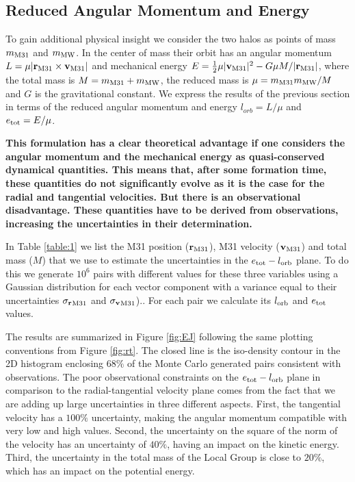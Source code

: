 \documentclass{emulateapj}
\begin{document}
\subsection{Reduced Angular Momentum and Energy}


To gain additional physical insight we consider the two halos as points of mass $m_{\rm M31}$ and $m_{\rm MW}$. In the center of mass their orbit has an angular momentum $L=\mu|{{\bf r}_{\rm M31}}\times{\bf v}_{\rm M31}|$ and mechanical energy $E=\frac{1}{2}\mu |{\bf v}_{\rm M31}|^2 - G\mu M/|{\bf r}_{\rm M31}|$, where the total mass is $M=m_{\rm M31}+m_{\rm MW}$, the reduced mass is $\mu=m_{\rm M31}m_{\rm MW}/M$ and $G$ is the gravitational constant. We express the results of the previous section in terms of the reduced angular momentum and energy $l_{orb}=L/\mu$ and $e_{\rm tot}=E/\mu$. 

{\bf This formulation has a clear theoretical advantage if one considers the angular momentum and the mechanical energy as quasi-conserved dynamical quantities. This means that, after some formation time, these quantities do not significantly evolve as it is the case for the radial and tangential velocities. But there is an observational disadvantage. These quantities have to be derived from observations, increasing the uncertainties in their determination.}

In Table \ref{table:1} we list the M31 position (${\bf r}_{\rm M31}$), M31 velocity (${\bf v}_{\rm M31}$) and total mass ($M$) that we use to estimate the uncertainties in the $e_{\rm tot}-l_{\rm orb}$ plane. To do this we generate $10^6$ pairs with different values for these three variables using a Gaussian distribution for each vector component with a variance equal to their uncertainties ${\sigma_{\bf r}}_{\rm M31}$ and ${\sigma_{\bf v}}_{\rm M31}$).. For each pair we calculate its $l_{\rm orb}$ and $e_{\rm tot}$ values.  

The results are summarized in Figure \ref{fig:EJ} following the same plotting conventions from Figure \ref{fig:rt}. The closed line is the iso-density contour in the 2D histogram enclosing $68\%$ of the Monte Carlo generated pairs consistent with observations. The poor observational constraints on the $e_{\rm tot}-l_{\rm orb}$ plane in comparison to the radial-tangential velocity plane comes from the fact that we are adding up large uncertainties in three different aspects. First, the tangential velocity has a $100\%$ uncertainty, making the angular momentum compatible with very low and high values. Second, the uncertainty on the square of the norm of the velocity has an uncertainty of $40\%$, having an impact on the kinetic energy. Third, the uncertainty in the total mass of the Local Group is close to $20\%$, which has an impact on the potential energy. 
\end{document}
